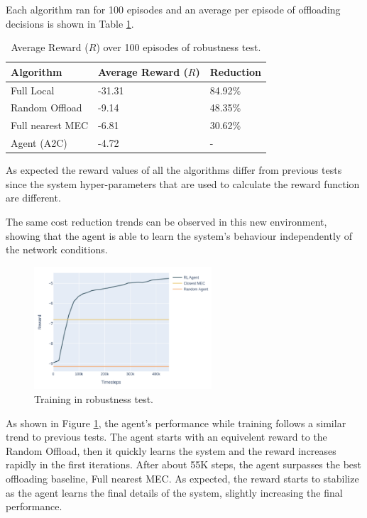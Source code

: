 Each algorithm ran for 100 episodes and an average per episode of offloading decisions is shown in Table \ref{robust_table}.

\begin{table}[H]
\centering
\begin{tabular}{|l|l|l|}
\hline
Algorithm        & Average Reward ($R$) & Reduction\\ \hline
Full Local       & -31.31 & 84.92\%\\
Random Offload   & -9.14 & 48.35\%\\
Full nearest MEC & -6.81 & 30.62\%\\ 
Agent (A2C) & -4.72 & -\\ \hline
\end{tabular}
\caption{Average Reward ($R$) over 100 episodes of robustness test.} \label{robust_table}
\end{table}

As expected the reward values of all the algorithms differ from previous tests since the system hyper-parameters that are used to calculate the reward function are different.

The same cost reduction trends can be observed in this new environment, showing that the agent is able to learn the system's behaviour independently of the network conditions.

\begin{figure}[H]
  \centering
  \includegraphics[width=250px]{images/5_10_training_new.png}
  \caption{Training in robustness test.}  \label{robust_training}
\end{figure}

As shown in Figure \ref{robust_training}, the agent's performance while training follows a similar trend to previous tests. The agent starts with an equivelent reward to the Random Offload, then it quickly learns the system and the reward increases rapidly in the first iterations. After about 55K steps, the agent surpasses the best offloading baseline, Full nearest MEC. As expected, the reward starts to stabilize as the agent learns the final details of the system, slightly increasing the final performance.

